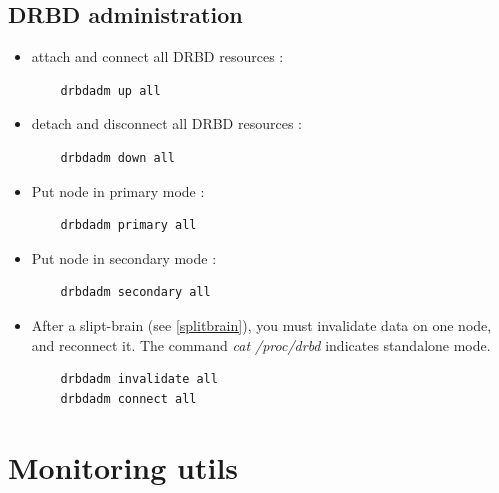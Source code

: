 \documentclass[a4paper,10pt]{report}
\begin{document}
\subsection{DRBD administration}
\label{drbd-admn}
\begin{itemize}
 \item attach and connect all DRBD resources :
    \begin{lstlisting}
    drbdadm up all
    \end{lstlisting}
\item detach and disconnect all DRBD resources :
    \begin{lstlisting}
    drbdadm down all
    \end{lstlisting}

\item Put node in primary mode :
    \begin{lstlisting}
    drbdadm primary all
    \end{lstlisting}

\item Put node in secondary mode :
    \begin{lstlisting}
    drbdadm secondary all
    \end{lstlisting}

\item After a slipt-brain (see \ref{splitbrain}), you must invalidate data on one node, and reconnect it. The command \textit{cat /proc/drbd} indicates standalone mode.
    \begin{lstlisting}
    drbdadm invalidate all
    drbdadm connect all
    \end{lstlisting}

\end{itemize}




\section{Monitoring utils}
\end{document}
